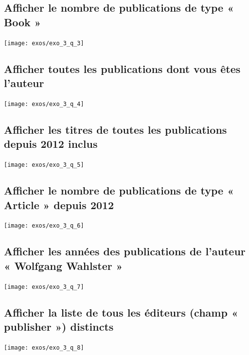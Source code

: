 \documentclass[12pt,a4paper]{article}
\begin{document}
\subsection{Afficher le nombre de publications de type « Book »}

\begin{center}
	\texttt{[image: exos/exo\_3\_q\_3]}
\end{center}

\subsection{Afficher toutes les publications dont vous êtes l'auteur}

\begin{center}
	\texttt{[image: exos/exo\_3\_q\_4]}
\end{center}

\subsection{Afficher les titres de toutes les publications depuis 2012 inclus}

\begin{center}
	\texttt{[image: exos/exo\_3\_q\_5]}
\end{center}

\subsection{Afficher le nombre de publications de type « Article » depuis 2012}

\begin{center}
	\texttt{[image: exos/exo\_3\_q\_6]}
\end{center}

\subsection{Afficher les années des publications de l'auteur « Wolfgang Wahlster »}

\begin{center}
	\texttt{[image: exos/exo\_3\_q\_7]}
\end{center}

\subsection{Afficher la liste de tous les éditeurs (champ « publisher ») distincts}

\begin{center}
	\texttt{[image: exos/exo\_3\_q\_8]}
\end{center}
\end{document}

